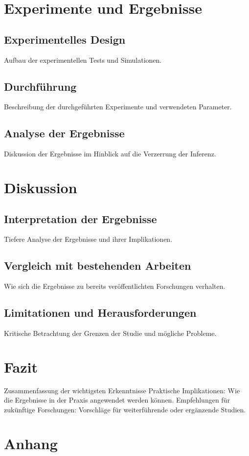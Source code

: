 \documentclass[%
thesis=student,%
coverpage=false,%
titlepage=false,%
headmarks=true, %
german,%
font=libertine, %
math=newpxtx, %
BCOR=5mm,%
coverBCOR=11mm%
]{tumbook}
\theoremstyle{break}
\begin{document}
\chapter{Experimente und Ergebnisse}
\section{Experimentelles Design}
Aufbau der experimentellen Tests und Simulationen.
\section{Durchführung}
Beschreibung der durchgeführten Experimente und verwendeten Parameter.
\section{Analyse der Ergebnisse}
Diskussion der Ergebnisse im Hinblick auf die Verzerrung der Inferenz.

\chapter{Diskussion}
\section{Interpretation der Ergebnisse}
Tiefere Analyse der Ergebnisse und ihrer Implikationen.
\section{Vergleich mit bestehenden Arbeiten}
Wie sich die Ergebnisse zu bereits veröffentlichten Forschungen verhalten.
\section{Limitationen und Herausforderungen}
Kritische Betrachtung der Grenzen der Studie und mögliche Probleme.
\chapter{Fazit}
Zusammenfassung der wichtigsten Erkenntnisse
Praktische Implikationen: Wie die Ergebnisse in der Praxis angewendet werden können.
Empfehlungen für zukünftige Forschungen: Vorschläge für weiterführende oder ergänzende Studien.
\chapter{Anhang}
\end{document}
